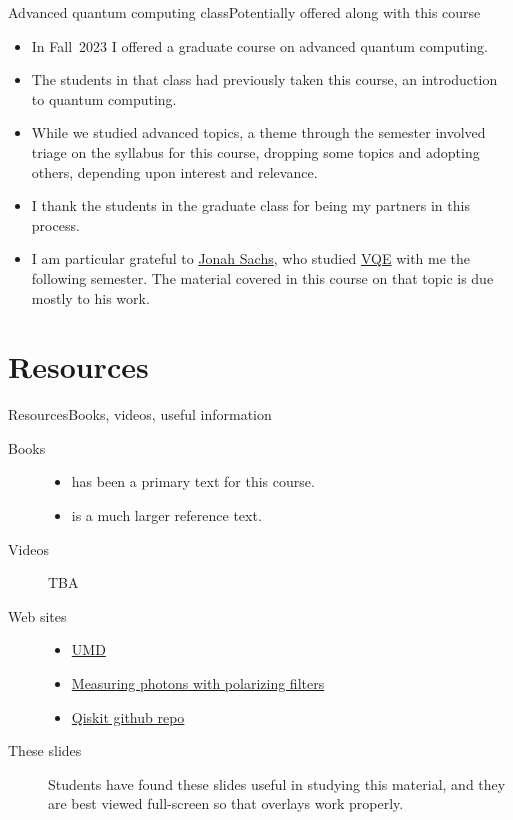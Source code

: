 \begin{frame}{Advanced quantum computing class}{Potentially offered along with this course}
\begin{itemize}
    \item In Fall~2023 I offered a graduate course on advanced quantum computing.
    \item The students in that class had previously taken this course, an introduction to quantum computing.
    \item While we studied advanced topics, a theme through the semester involved triage on the syllabus for this course, dropping some topics and adopting others, depending upon interest and relevance.
    \item I thank the students in the graduate class for being my partners in this process.
    \item I am particular grateful to \href{https://www.linkedin.com/in/jonah-sachs-066986240/}{Jonah Sachs}, who studied \href{https://en.wikipedia.org/wiki/Variational_quantum_eigensolver}{VQE} with me the following semester.  The material covered in this course on that topic is due mostly to his work. 
\end{itemize}
    
\end{frame}

\section*{Resources}
\begin{frame}{Resources}{Books, videos, useful information}
\begin{description}
    \item[Books]
    \begin{itemize}
        \item \Kaye{} has been a primary text for this course.
        \item \MikeIke{} is a much larger reference text.
    \end{itemize}
    \item[Videos] TBA
    \item[Web sites]
    \begin{itemize}
        \item \href{https://quantumatlas.umd.edu/}{UMD}
        \item \href{https://quantumatlas.umd.edu/gallery/MeasuringPolarization}{Measuring photons with polarizing filters}
        \item \href{https://github.com/Qiskit/}{Qiskit github repo}
    \end{itemize}
    \item[These slides] Students have found these slides useful in studying this material, and they are best viewed full-screen so that overlays work properly.
    
\end{description}
\end{frame}

